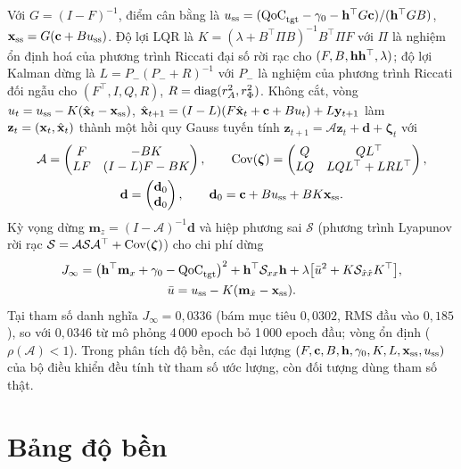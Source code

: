 Với $G=(I-F)^{-1}$, điểm cân bằng là $u_{\mathrm{ss}}=(\mathrm{QoC}_{\mathrm{tgt}}-\gamma_0-\mathbf{h}^\top G\mathbf c)/(\mathbf{h}^\top GB)$, $\mathbf{x}_{\mathrm{ss}}=G(\mathbf c+Bu_{\mathrm{ss}})$. Độ lợi LQR là $K=(\lambda+B^\top\Pi B)^{-1}B^\top\Pi F$ với $\Pi$ là nghiệm ổn định hoá của phương trình Riccati đại số rời rạc cho $(F,B,\mathbf{h}\mathbf{h}^\top,\lambda)$; độ lợi Kalman dừng là $L=P_-(P_-+R)^{-1}$ với $P_-$ là nghiệm của phương trình Riccati đối ngẫu cho $(F^\top,I,Q,R)$, $R=\operatorname{diag}(r_{A}^2,r_{\Phi}^2)$. Không cắt, vòng $u_t=u_{\mathrm{ss}}-K(\hat{\mathbf{x}}_t-\mathbf{x}_{\mathrm{ss}})$, $\hat{\mathbf{x}}_{t+1}=(I-L)(F\hat{\mathbf{x}}_t+\mathbf c+Bu_t)+L\mathbf{y}_{t+1}$ làm $\mathbf z_t=(\mathbf{x}_t,\hat{\mathbf{x}}_t)$ thành một hồi quy Gauss tuyến tính $\mathbf z_{t+1}=\mathcal A\mathbf z_t+\mathbf d+\boldsymbol\zeta_t$ với
\begin{gather*}
\mathcal A=\begin{pmatrix}F & -BK\\ LF & (I-L)F-BK\end{pmatrix},\qquad
\operatorname{Cov}(\boldsymbol\zeta)=\begin{pmatrix}Q & QL^\top\\ LQ & LQL^\top+LRL^\top\end{pmatrix},\\
\mathbf d=\begin{pmatrix}\mathbf d_0\\ \mathbf d_0\end{pmatrix},\qquad \mathbf d_0=\mathbf c+Bu_{\mathrm{ss}}+BK\mathbf{x}_{\mathrm{ss}}.
\end{gather*}
Kỳ vọng dừng $\mathbf m_z=(I-\mathcal A)^{-1}\mathbf d$ và hiệp phương sai $\mathcal S$ (phương trình Lyapunov rời rạc $\mathcal S=\mathcal A\mathcal S\mathcal A^\top+\operatorname{Cov}(\boldsymbol\zeta)$) cho chi phí dừng
\begin{gather*}
J_\infty=\bigl(\mathbf{h}^\top\mathbf m_x+\gamma_0-\mathrm{QoC}_{\mathrm{tgt}}\bigr)^2+\mathbf{h}^\top\mathcal S_{xx}\mathbf{h}+\lambda\bigl[\bar u^2+K\mathcal S_{\hat x\hat x}K^\top\bigr],\\
\bar u=u_{\mathrm{ss}}-K(\mathbf m_{\hat x}-\mathbf{x}_{\mathrm{ss}}).
\end{gather*}
Tại tham số danh nghĩa $J_\infty=0{,}0336$ (bám mục tiêu $0{,}0302$, RMS đầu vào $0{,}185$), so với $0{,}0346$ từ mô phỏng 4\,000 epoch bỏ 1\,000 epoch đầu; vòng ổn định ($\rho(\mathcal A)<1$). Trong phân tích độ bền, các đại lượng $(F,\mathbf c,B,\mathbf{h},\gamma_0,K,L,\mathbf{x}_{\mathrm{ss}},u_{\mathrm{ss}})$ của bộ điều khiển đều tính từ tham số ước lượng, còn đối tượng dùng tham số thật.

\clearpage
\section{Bảng độ bền}
\label{app:robust}

